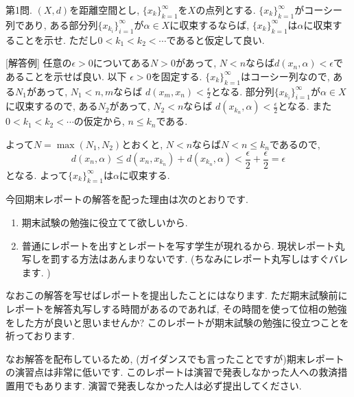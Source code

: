 \documentclass[dvipdfmx,a4paper,11pt]{article}
\theoremstyle{definition}
\begin{document}

   
   {\large 第1問.} $(X,d)$を距離空間とし, $\{ x_{k}\}_{k=1}^{\infty}$を$X$の点列とする.  $\{ x_{k}\}_{k=1}^{\infty}$がコーシー列であり, ある部分列$\{ x_{k_{i}}\}_{i=1}^{\infty}$が$\alpha \in X$に収束するならば, $\{ x_{k}\}_{k=1}^{\infty}$は$\alpha$に収束することを示せ. ただし$0<k_1<k_2<\cdots$であると仮定して良い. 
   
 \vspace{10pt}

[解答例] 
任意の$\epsilon >0$についてある$N>0$があって, $N<n$ならば$d(x_{n}, \alpha)<\epsilon$であることを示せば良い. 
以下 $\epsilon >0$を固定する. 
$\{ x_{k}\}_{k=1}^{\infty}$はコーシー列なので, ある$N_1$があって, $N_1 < n,m$ならば
$d(x_m, x_n) < \frac{\epsilon}{2}$となる.
部分列$\{ x_{k_{i}}\}_{i=1}^{\infty}$が$\alpha \in X$に収束するので, ある$N_2$があって, $N_2 < n$ならば
$d(x_{k_n}, \alpha) <  \frac{\epsilon}{2}$となる.
また$0<k_1<k_2<\cdots$の仮定から, $n\le k_n$である. 

よって$N=\max(N_1, N_2)$とおくと, $N<n$ならば$N<n\le k_n$であるので, 
$$d(x_{n}, \alpha)\le d(x_{n}, x_{k_n}) + d(x_{k_n}, \alpha) < \frac{\epsilon}{2}+ \frac{\epsilon}{2} = \epsilon$$
となる. よって$\{ x_{k}\}_{k=1}^{\infty}$は$\alpha$に収束する.


 \vspace{15pt}

\begin{tcolorbox}[
    colback = white,
    colframe = green!35!black,
    fonttitle = \bfseries,
    breakable = true]
    今回期末レポートの解答を配った理由は次のとおりです.
    \begin{enumerate}
    \setlength{\parskip}{0cm} 
  \setlength{\itemsep}{0cm} 
    \item 期末試験の勉強に役立てて欲しいから.
    \item 普通にレポートを出すとレポートを写す学生が現れるから. 現状レポート丸写しを罰する方法はあんまりないです. (ちなみにレポート丸写しはすぐバレます. )  %
    \end{enumerate}
    なおこの解答を写せばレポートを提出したことにはなります. 
    ただ期末試験前にレポートを解答丸写しする時間があるのであれば, その時間を使って位相の勉強をした方が良いと思いませんか?
    このレポートが期末試験の勉強に役立つことを祈っております. 
    
\vspace{2pt}    
    なお解答を配布しているため, (ガイダンスでも言ったことですが)期末レポートの演習点は非常に低いです. このレポートは演習で発表しなかった人への救済措置用でもあります. 演習で発表しなかった人は必ず提出してください. 
 \end{tcolorbox}
\end{document}
